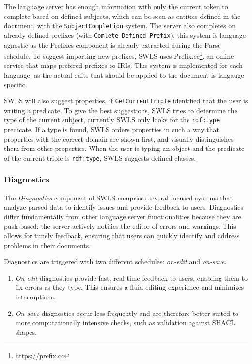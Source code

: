 The language server has enough information with only the current token to complete based on defined subjects, which can be seen as entities defined in the document, with the \texttt{SubjectCompletion} system.
The server also completes on already defined prefixes (with \texttt{Comlete Defined Prefix}), this system is language agnostic as the Prefixes component is already extracted during the Parse schedule.
To suggest importing new prefixes, SWLS uses Prefix.cc\footnote{\url{https://prefix.cc}}, an online service that maps prefered prefixes to IRIs.
This system is implemented for each language, as the actual edits that should be applied to the document is langauge specific.

SWLS will also suggest properties, if \texttt{GetCurrentTriple} identified that the user is writing a predicate.
To give the best suggestions, SWLS tries to determine the type of the current subject, currently SWLS only looks for the \texttt{rdf:type} predicate. 
If a type is found, SWLS orders properties in such a way that properties with the correct domain are shown first,
and visually distinguishes them from other properties.
When the user is typing an object and the predicate of the current triple is \texttt{rdf:type}, SWLS suggests defined classes.


\subsubsection{Diagnostics}

The \textit{Diagnostics} component of SWLS comprises several focused systems that analyze parsed data to identify issues and provide feedback to users.
Diagnostics differ fundamentally from other language server functionalities because they are push-based: the server actively notifies the editor of errors and warnings.
This allows for timely feedback, ensuring that users can quickly identify and address problems in their documents.

Diagnostics are triggered with two different schedules: \textit{on-edit} and \textit{on-save}.

\begin{enumerate}
  \item \textit{On edit} diagnostics provide fast, real-time feedback to users, enabling them to fix errors as they type. 
    This ensures a fluid editing experience and minimizes interruptions.
  \item \textit{On save} diagnostics occur less frequently and are therefore better suited to more computationally intensive checks,
   such as validation against SHACL shapes.
\end{enumerate}

